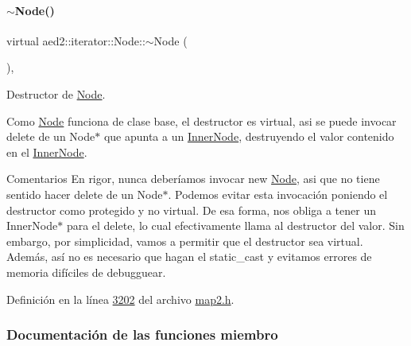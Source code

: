 \paragraph{\texorpdfstring{$\sim$\+Node()}{~Node()}}
{\footnotesize\ttfamily virtual aed2\+::iterator\+::\+Node\+::$\sim$\+Node (\begin{DoxyParamCaption}{ }\end{DoxyParamCaption})\hspace{0.3cm}{\ttfamily [inline]}, {\ttfamily [virtual]}}



Destructor de \hyperlink{structaed2_1_1iterator_1_1Node}{Node}. 

Como \hyperlink{structaed2_1_1iterator_1_1Node}{Node} funciona de clase base, el destructor es virtual, asi se puede invocar delete de un Node$\ast$ que apunta a un \hyperlink{structaed2_1_1iterator_1_1InnerNode}{Inner\+Node}, destruyendo el valor contenido en el \hyperlink{structaed2_1_1iterator_1_1InnerNode}{Inner\+Node}.

\begin{DoxyRemark}{Comentarios}
En rigor, nunca deberíamos invocar new \hyperlink{structaed2_1_1iterator_1_1Node}{Node}, asi que no tiene sentido hacer delete de un Node$\ast$. Podemos evitar esta invocación poniendo el destructor como protegido y no virtual. De esa forma, nos obliga a tener un Inner\+Node$\ast$ para el delete, lo cual efectivamente llama al destructor del valor. Sin embargo, por simplicidad, vamos a permitir que el destructor sea virtual. Además, así no es necesario que hagan el {\ttfamily static\+\_\+cast} y evitamos errores de memoria difíciles de debugguear. 
\end{DoxyRemark}


Definición en la línea \hyperlink{map2_8h_source_l03202}{3202} del archivo \hyperlink{map2_8h_source}{map2.\+h}.



\subsubsection{Documentación de las funciones miembro}
\mbox{\label{structaed2_1_1iterator_1_1Node_ac65ed5331c97b4a00f435c169283f92f_ac65ed5331c97b4a00f435c169283f92f}} 
